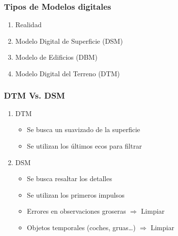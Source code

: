 \begin{frame}
  \frametitle{Tipos de Modelos digitales}
  \begin{minipage}{.4\textwidth}
  \begin{enumerate}[<+->]
    \item Realidad
    \item Modelo Digital de Superficie (DSM)
    \item Modelo de Edificios (DBM)
    \item Modelo Digital del Terreno (DTM)
  \end{enumerate}
  \end{minipage}
  \begin{minipage}{.55\textwidth}
  \end{minipage}
\end{frame}
\begin{frame}
  \frametitle{DTM Vs. DSM}
  \begin{enumerate}
    \item \alert{DTM}
    \begin{itemize}
      \item Se busca un suavizado de la superficie
      \item Se utilizan los últimos ecos para filtrar
    \end{itemize}
    \item \alert{DSM}
    \begin{itemize}
      \item Se busca resaltar los detalles
      \item Se utilizan los primeros impulsos
      \item Errores en observaciones groseras $\Rightarrow$ \alert{Limpiar}
      \item Objetos temporales (coches, gruas\ldots) $\Rightarrow$ \alert{Limpiar}
    \end{itemize}
  \end{enumerate}
\end{frame}
